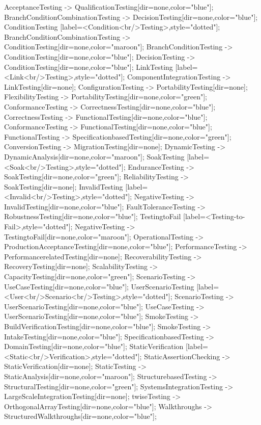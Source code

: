 \documentclass{article}
\begin{document}
{AcceptanceTesting -> QualificationTesting[dir=none,color="blue"];
BranchConditionCombinationTesting -> DecisionTesting[dir=none,color="blue"];
ConditionTesting [label=<Condition<br/>Testing>,style="dotted"];
BranchConditionCombinationTesting -> ConditionTesting[dir=none,color="maroon"];
BranchConditionTesting -> ConditionTesting[dir=none,color="blue"];
DecisionTesting -> ConditionTesting[dir=none,color="blue"];
LinkTesting [label=<Link<br/>Testing>,style="dotted"];
ComponentIntegrationTesting -> LinkTesting[dir=none];
ConfigurationTesting -> PortabilityTesting[dir=none];
FlexibilityTesting -> PortabilityTesting[dir=none,color="green"];
ConformanceTesting -> CorrectnessTesting[dir=none,color="blue"];
CorrectnessTesting -> FunctionalTesting[dir=none,color="blue"];
ConformanceTesting -> FunctionalTesting[dir=none,color="blue"];
FunctionalTesting -> SpecificationbasedTesting[dir=none,color="green"];
ConversionTesting -> MigrationTesting[dir=none];
DynamicTesting -> DynamicAnalysis[dir=none,color="maroon"];
SoakTesting [label=<Soak<br/>Testing>,style="dotted"];
EnduranceTesting -> SoakTesting[dir=none,color="green"];
ReliabilityTesting -> SoakTesting[dir=none];
InvalidTesting [label=<Invalid<br/>Testing>,style="dotted"];
NegativeTesting -> InvalidTesting[dir=none,color="blue"];
FaultToleranceTesting -> RobustnessTesting[dir=none,color="blue"];
TestingtoFail [label=<Testing-to-Fail>,style="dotted"];
NegativeTesting -> TestingtoFail[dir=none,color="maroon"];
OperationalTesting -> ProductionAcceptanceTesting[dir=none,color="blue"];
PerformanceTesting -> PerformancerelatedTesting[dir=none];
RecoverabilityTesting -> RecoveryTesting[dir=none];
ScalabilityTesting -> CapacityTesting[dir=none,color="green"];
ScenarioTesting -> UseCaseTesting[dir=none,color="blue"];
UserScenarioTesting [label=<User<br/>Scenario<br/>Testing>,style="dotted"];
ScenarioTesting -> UserScenarioTesting[dir=none,color="blue"];
UseCaseTesting -> UserScenarioTesting[dir=none,color="blue"];
SmokeTesting -> BuildVerificationTesting[dir=none,color="blue"];
SmokeTesting -> IntakeTesting[dir=none,color="blue"];
SpecificationbasedTesting -> DomainTesting[dir=none,color="blue"];
StaticVerification [label=<Static<br/>Verification>,style="dotted"];
StaticAssertionChecking -> StaticVerification[dir=none];
StaticTesting -> StaticAnalysis[dir=none,color="maroon"];
StructurebasedTesting -> StructuralTesting[dir=none,color="green"];
SystemsIntegrationTesting -> LargeScaleIntegrationTesting[dir=none];
twiseTesting -> OrthogonalArrayTesting[dir=none,color="blue"];
Walkthroughs -> StructuredWalkthroughs[dir=none,color="blue"];

}
\end{document}
